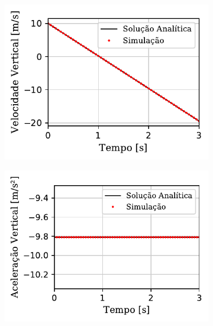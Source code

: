 \begin{figure}[h]
{\begin{center}
\begin{subfigure}[t]{\smallresultsfigwidth}
			\caption{}
			\label{subfig:x_velocity}
		\end{subfigure}
		\begin{subfigure}[t]{\smallresultsfigwidth}
			\centering
			\includegraphics[scale=1]{images/falling_sphere/y_velocity.pdf}
			\caption{}
			\label{subfig:y_velocity}
		\end{subfigure}
		\begin{subfigure}[t]{\smallresultsfigwidth}
			\centering
			\includegraphics[scale=1]{images/falling_sphere/y_acceleration.pdf}
			\caption{}
			\label{subfig:y_acceleration}
		\end{subfigure}
	\end{center}
	}
	\label{fig:falling_sphere_other}
	\sourceMe
\end{figure}

